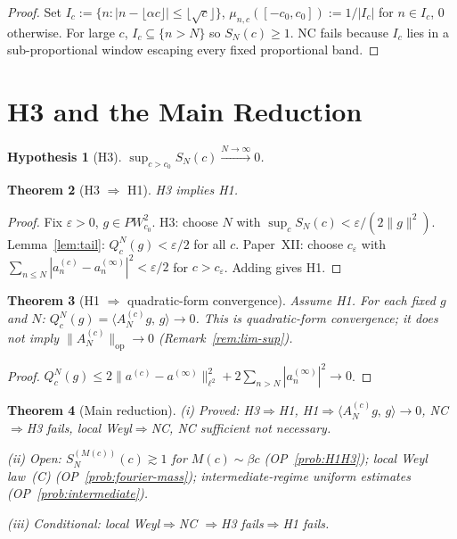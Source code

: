 \documentclass[12pt,a4paper]{amsart}
\newtheorem{theorem}{Theorem}[section]
\newtheorem{hypothesis}[theorem]{Hypothesis}
\theoremstyle{definition}
\theoremstyle{remark}
\newcommand{\norm}[1]{\|#1\|}
\newcommand{\ip}[2]{\langle #1,\, #2\rangle}
\newcommand{\PW}{PW}
\newcommand{\Ac}{A_N^{(c)}}
\begin{document}
\begin{proof}
Set $I_c:=\{n:|n-\lfloor\alpha c\rfloor|
\le\lfloor\sqrt{c}\rfloor\}$,
$\mu_{n,c}([-c_0,c_0]):=1/|I_c|$
for $n\in I_c$, $0$ otherwise.
For large $c$, $I_c\subseteq\{n>N\}$
so $S_N(c)\ge 1$.
NC fails because $I_c$ lies in a
sub-proportional window
escaping every fixed proportional band.
\end{proof}

\section{H3 and the Main Reduction}
\label{sec:H3}

\begin{hypothesis}[H3]
\label{hyp:H3}
$\sup_{c>c_0}S_N(c)\xrightarrow{N\to\infty}0$.
\end{hypothesis}

\begin{theorem}[H3 $\Rightarrow$ H1]
\label{thm:H3-H1}
H3 implies H1.
\end{theorem}
\begin{proof}
Fix $\varepsilon>0$, $g\in\PW_{c_0}^2$.
H3: choose $N$ with
$\sup_c S_N(c)<\varepsilon/(2\norm{g}^2)$.
Lemma~\ref{lem:tail}: $Q_c^N(g)<\varepsilon/2$
for all $c$.
Paper~XII: choose $c_\varepsilon$ with
$\sum_{n\le N}|a_n^{(c)}-a_n^{(\infty)}|^2
<\varepsilon/2$ for $c>c_\varepsilon$.
Adding gives H1.
\end{proof}

\begin{theorem}[H1 $\Rightarrow$
  quadratic-form convergence]
\label{thm:H1-H3-ptwise}
Assume H1. For each fixed $g$ and $N$:
$Q_c^N(g)=\ip{\Ac g}{g}\to 0$.
This is quadratic-form convergence;
it does not imply
$\norm{\Ac}_{\mathrm{op}}\to 0$
(Remark~\ref{rem:lim-sup}).
\end{theorem}
\begin{proof}
$Q_c^N(g)
\le 2\norm{a^{(c)}-a^{(\infty)}}^2_{\ell^2}
+2\sum_{n>N}|a_n^{(\infty)}|^2\to 0$.
\end{proof}

\begin{theorem}[Main reduction]
\label{thm:reduction}
\textup{(i)} Proved:
H3$\Rightarrow$H1,
H1$\Rightarrow\ip{\Ac g}{g}\to 0$,
NC$\Rightarrow$H3 fails,
local Weyl$\Rightarrow$NC,
NC sufficient not necessary.

\textup{(ii)} Open:
$S_N^{(M(c))}(c)\gtrsim 1$
for $M(c)\sim\beta c$
(OP~\ref{prob:H1H3});
local Weyl law~(C)
(OP~\ref{prob:fourier-mass});
intermediate-regime uniform estimates
(OP~\ref{prob:intermediate}).

\textup{(iii)} Conditional:
local Weyl$\Rightarrow$NC
$\Rightarrow$H3 fails$\Rightarrow$H1 fails.
\end{theorem}
\end{document}
